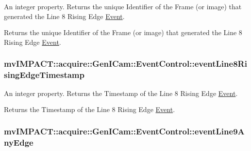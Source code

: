 An integer property. Returns the unique Identifier of the Frame (or image) that generated the Line 8 Rising Edge \hyperlink{classmv_i_m_p_a_c_t_1_1acquire_1_1_event}{Event}. 

Returns the unique Identifier of the Frame (or image) that generated the Line 8 Rising Edge \hyperlink{classmv_i_m_p_a_c_t_1_1acquire_1_1_event}{Event}. \hypertarget{classmv_i_m_p_a_c_t_1_1acquire_1_1_gen_i_cam_1_1_event_control_ae6b173783ceb3cb579bab3a7d09cd241}{
\subsubsection[{event\+Line8\+Rising\+Edge\+Timestamp}]{ mv\+I\+M\+P\+A\+C\+T\+::acquire\+::\+Gen\+I\+Cam\+::\+Event\+Control\+::event\+Line8\+Rising\+Edge\+Timestamp}}\label{classmv_i_m_p_a_c_t_1_1acquire_1_1_gen_i_cam_1_1_event_control_ae6b173783ceb3cb579bab3a7d09cd241}


An integer property. Returns the Timestamp of the Line 8 Rising Edge \hyperlink{classmv_i_m_p_a_c_t_1_1acquire_1_1_event}{Event}. 

Returns the Timestamp of the Line 8 Rising Edge \hyperlink{classmv_i_m_p_a_c_t_1_1acquire_1_1_event}{Event}. \hypertarget{classmv_i_m_p_a_c_t_1_1acquire_1_1_gen_i_cam_1_1_event_control_a411174311dd3be61f965cea761102388}{
\subsubsection[{event\+Line9\+Any\+Edge}]{ mv\+I\+M\+P\+A\+C\+T\+::acquire\+::\+Gen\+I\+Cam\+::\+Event\+Control\+::event\+Line9\+Any\+Edge}}\label{classmv_i_m_p_a_c_t_1_1acquire_1_1_gen_i_cam_1_1_event_control_a411174311dd3be61f965cea761102388}


